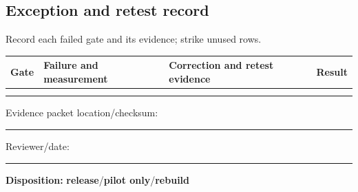\subsection*{Exception and retest record}
\noindent Record each failed gate and its evidence; strike unused rows.

\renewcommand{\arraystretch}{1.65}
\begin{tabularx}{\linewidth}{@{}p{.08\linewidth}p{.34\linewidth}p{.35\linewidth}L@{}}
\toprule
\textbf{Gate} & \textbf{Failure and measurement} & \textbf{Correction and retest evidence} & \textbf{Result}\\
\midrule
 & & & \\
\cmidrule(lr){1-4}
 & & & \\
\bottomrule
\end{tabularx}
\renewcommand{\arraystretch}{1}

\smallskip
\noindent Evidence packet location/checksum:\ \rule{.60\linewidth}{.35pt}

\smallskip
\noindent Reviewer/date:\ \rule{.24\linewidth}{.35pt}\hfill
\textbf{Disposition:}\quad
\textbf{release}\quad/\quad\textbf{pilot only}\quad/\quad\textbf{rebuild}


